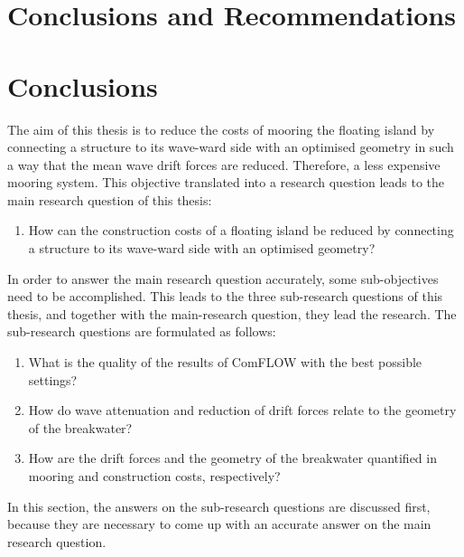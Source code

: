 \section{Conclusions and Recommendations}
\label{ch: conclusions recommendations}

\section{Conclusions}
The aim of this thesis is to reduce the costs of mooring the floating island by connecting a structure to its wave-ward side with an optimised geometry in such a way that the mean wave drift forces are reduced. Therefore, a less expensive mooring system. This objective translated into a research question leads to the main research question of this thesis:

\begin{enumerate}
    \item How can the construction costs of a floating island be reduced by connecting a structure to its wave-ward side with an optimised geometry?
\end{enumerate}

In order to answer the main research question accurately, some sub-objectives need to be accomplished. This leads to the three sub-research questions of this thesis, and together with the main-research question, they lead the research. The sub-research questions are formulated as follows:

\begin{enumerate}[resume]
    \item What is the quality of the results of ComFLOW with the best possible settings?
    \item How do wave attenuation and reduction of drift forces relate to the geometry of the breakwater?
    \item How are the drift forces and the geometry of the breakwater quantified in mooring and construction costs, respectively?
\end{enumerate}



In this section, the answers on the sub-research questions are discussed first, because they are necessary to come up with an accurate answer on the main research question. 

